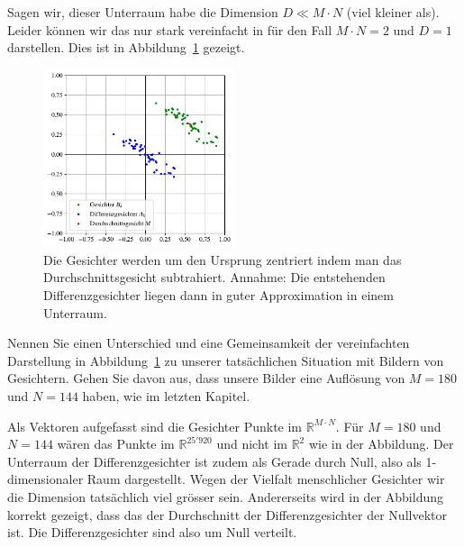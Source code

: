 Sagen wir, dieser Unterraum habe die Dimension $D\ll M\cdot N$ (\glqq{}viel kleiner als\grqq{}).
Leider können wir das nur stark vereinfacht in für den Fall $M\cdot N=2$ und $D=1$ darstellen.
Dies ist in Abbildung~\ref{fig:meandiff} gezeigt.
\begin{figure}[ht]
	\centering
	\includegraphics[width=0.5\textwidth]{images/facespace/meandiff}
	\caption{Die Gesichter werden um den Ursprung zentriert indem man das Durchschnittsgesicht subtrahiert.
	Annahme: Die entstehenden Differenzgesichter liegen dann in guter Approximation in einem Unterraum.}
	\label{fig:meandiff}
\end{figure}
\begin{aufgabe}
	Nennen Sie einen Unterschied und eine Gemeinsamkeit der vereinfachten Darstellung in Abbildung~\ref{fig:meandiff} zu unserer tatsächlichen Situation mit Bildern von Gesichtern.
	Gehen Sie davon aus, dass unsere Bilder eine Auflösung von $M=180$ und $N=144$ haben, wie im letzten Kapitel.
\end{aufgabe}
\begin{losung*}
	Als Vektoren aufgefasst sind die Gesichter Punkte im $\mathbb R^{M\cdot N}$.
	Für $M=180$ und $N=144$ wären das Punkte im $\mathbb R^{25'920}$ und nicht im $\mathbb R^2$ wie in der Abbildung.
	Der Unterraum der Differenzgesichter ist zudem als Gerade durch Null, also als 1-dimensionaler Raum dargestellt.
	Wegen der Vielfalt menschlicher Gesichter wir die Dimension tatsächlich viel grösser sein.
	Andererseits wird in der Abbildung korrekt gezeigt, dass das der Durchschnitt der Differenzgesichter der Nullvektor ist.
	Die Differenzgesichter sind also \glqq{}um Null verteilt\grqq{}.
\end{losung*}